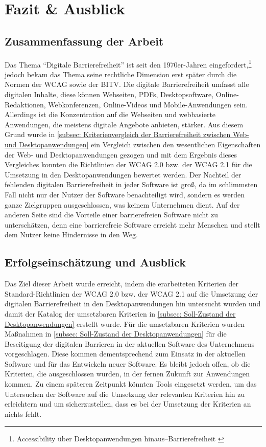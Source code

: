 \section{Fazit \& Ausblick}

\subsection{Zusammenfassung der Arbeit}
Das Thema "`Digitale Barrierefreiheit"' ist seit den 1970er-Jahren eingefordert,\footnote{Accessibility über Desktopanwendungen hinaus–Barrierefreiheit \cite{buhler2017accessibility}} jedoch bekam das Thema seine rechtliche Dimension erst später durch die Normen der \ac{WCAG} sowie der \ac{BITV}. Die digitale Barrierefreiheit umfasst alle digitalen Inhalte, diese können Webseiten, PDFs, Desktopsoftware, Online-Redaktionen, Webkonferenzen, Online-Videos und Mobile-Anwendungen sein. Allerdings ist die Konzentration auf die Webseiten und webbasierte Anwendungen, die meistens digitale Angebote anbieten, stärker. Aus diesem Grund wurde in \cref{subsec: Kriterienvergleich der Barrierefreiheit zwischen Web- und Desktopanwendungen} ein Vergleich zwischen den wesentlichen Eigenschaften der Web- und Desktopanwendungen gezogen und mit dem Ergebnis dieses Vergleiches konnten die Richtlinien der \ac{WCAG} 2.0 bzw. der \ac{WCAG} 2.1 für die Umsetzung in den Desktopanwendungen bewertet werden. Der Nachteil der fehlenden digitalen Barrierefreiheit in jeder Software ist groß, da im schlimmsten Fall nicht nur der Nutzer der Software benachteiligt wird, sondern es werden ganze Zielgruppen ausgeschlossen, was keinem Unternehmen dient. Auf der anderen Seite sind die Vorteile einer barrierefreien Software nicht zu unterschätzen, denn eine barrierefreie Software erreicht mehr Menschen und stellt dem Nutzer keine Hindernisse in den Weg.

\subsection{Erfolgseinschätzung und Ausblick}
Das Ziel dieser Arbeit wurde erreicht, indem die erarbeiteten Kriterien der Standard-Richtlinien der \ac{WCAG} 2.0 bzw. der \ac{WCAG} 2.1 auf die Umsetzung der digitalen Barrierefreiheit in den Desktopanwendungen hin untersucht wurden und damit der Katalog der umsetzbaren Kriterien in \cref{subsec: Soll-Zustand der Desktopanwendungen} erstellt wurde. Für die umsetzbaren Kriterien wurden Maßnahmen in \cref{subsec: Soll-Zustand der Desktopanwendungen} für die Beseitigung der digitalen Barrieren in der aktuellen Software des Unternehmens vorgeschlagen. Diese kommen dementsprechend zum Einsatz in der aktuellen Software und für das Entwickeln neuer Software. Es bleibt jedoch offen, ob die Kriterien, die ausgeschlossen wurden, in der fernen Zukunft zur Anwendungen kommen. Zu einem späteren Zeitpunkt könnten Tools eingesetzt werden, um das Untersuchen der Software auf die Umsetzung der relevanten Kriterien hin zu erleichtern und um sicherzustellen, dass es bei der Umsetzung der Kriterien an nichts fehlt.

\label{seitenreinschrifft}
